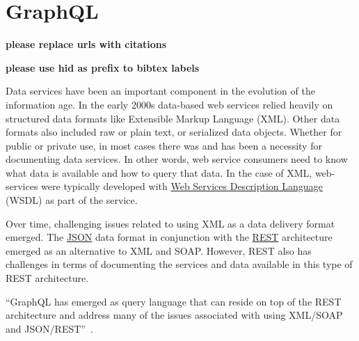 \section{GraphQL}

{\bf please replace urls with citations}

{\bf please use  hid as prefix to bibtex labels}

Data services have been an important component in the evolution of the
information age.  In the early 2000s data-based web services relied
heavily on structured data formats like Extensible Markup
Language (XML).  Other data formats also included raw or plain text, or
serialized data objects.  Whether for public or private use, in most
cases there was and has been a necessity for documenting data
services.  In other words, web service consumers need to know what
data is available and how to query that data.  In the case of XML,
web-services were typically developed with \href{https://en.wikipedia.org/wiki/Web_Services_Description_Language}
{Web Services Description Language} (WSDL) as part of the service.

Over time, challenging issues related to using XML as a data delivery format 
emerged.  The \href{https://en.wikipedia.org/wiki/JSON}{JSON} data format in 
conjunction with the \href{https://en.wikipedia.org/wiki/Representational_state_transfer}{REST} 
architecture emerged as an alternative to XML and SOAP.  However, REST also has 
challenges in terms of documenting the services and data available in this 
type of REST architecture.

``GraphQL has emerged as query language that can reside on top of the REST 
architecture and address many of the issues associated with using XML/SOAP and 
JSON/REST''~\cite{GraphQL2018}.
